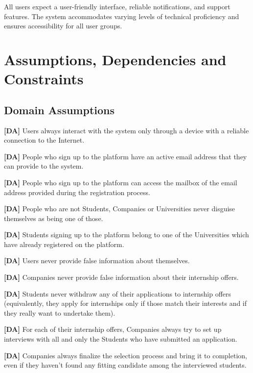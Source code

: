 All users expect a user-friendly interface, reliable notifications, and support features. The system accommodates varying levels of technical proficiency and ensures accessibility for all user groups.

\section{Assumptions, Dependencies and Constraints}
\label{sec:assumptions_dependencies_constraints}%

\subsection{Domain Assumptions}
\label{subsec:domain_assumptions}%

\setcounter{da}{1}
\newcommand{\cda}{\theda{}}

    \textbf{[DA\cda]} Users always interact with the system only through a device with a reliable connection to the Internet.

    \textbf{[DA\cda]} People who sign up to the platform have an active email address that they can provide to the system.

    \textbf{[DA\cda]} People who sign up to the platform can access the mailbox of the email address provided during the registration process.

    \textbf{[DA\cda]} People who are not Students, Companies or Universities never disguise themselves as being one of those.

    \textbf{[DA\cda]} Students signing up to the platform belong to one of the Universities which have already registered on the platform.

    \textbf{[DA\cda]} Users never provide false information about themselves.

    \textbf{[DA\cda]} Companies never provide false information about their internship offers.

    \textbf{[DA\cda]} Students never withdraw any of their applications to internship offers (equivalently, they apply for internships only if those match their interests and if they really want to undertake them).

    \textbf{[DA\cda]} For each of their internship offers, Companies always try to set up interviews with all and only the Students who have submitted an application.

    \textbf{[DA\cda]} Companies always finalize the selection process and bring it to completion, even if they haven't found any fitting candidate among the interviewed students.

